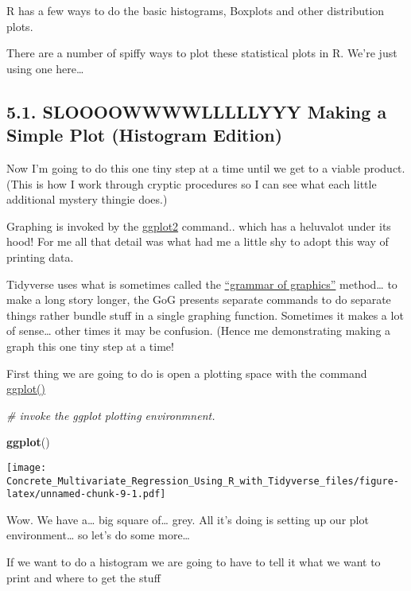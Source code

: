 \documentclass[]{article}
\newenvironment{Shaded}{\begin{snugshade}}{\end{snugshade}}
\newcommand{\CommentTok}[1]{\textcolor[rgb]{0.56,0.35,0.01}{\textit{#1}}}
\newcommand{\KeywordTok}[1]{\textcolor[rgb]{0.13,0.29,0.53}{\textbf{#1}}}
\newcommand{\NormalTok}[1]{#1}
\begin{document}
R has a few ways to do the basic histograms, Boxplots and other
distribution plots.

There are a number of spiffy ways to plot these statistical plots in R.
We're just using one here\ldots{}

\hypertarget{sloooowwwwlllllyyy-making-a-simple-plot-histogram-edition}{%
\subsection{5.1. SLOOOOWWWWLLLLLYYY Making a Simple Plot (Histogram
Edition)}\label{sloooowwwwlllllyyy-making-a-simple-plot-histogram-edition}}

Now I'm going to do this one tiny step at a time until we get to a
viable product. (This is how I work through cryptic procedures so I can
see what each little additional mystery thingie does.)

Graphing is invoked by the \href{https://ggplot2.tidyverse.org}{ggplot2}
command.. which has a heluvalot under its hood! For me all that detail
was what had me a little shy to adopt this way of printing data.

Tidyverse uses what is sometimes called the
\href{https://ramnathv.github.io/pycon2014-r/visualize/ggplot2.html}{``grammar
of graphics''} method\ldots{} to make a long story longer, the GoG
presents separate commands to do separate things rather bundle stuff in
a single graphing function. Sometimes it makes a lot of sense\ldots{}
other times it may be confusion. (Hence me demonstrating making a graph
this one tiny step at a time!

First thing we are going to do is open a plotting space with the command
\href{https://ggplot2.tidyverse.org/reference/ggplot.html}{ggplot()}

\begin{Shaded}
\begin{Highlighting}[]
\CommentTok{# invoke the ggplot plotting environmnent.}

\KeywordTok{ggplot}\NormalTok{() }
\end{Highlighting}
\end{Shaded}

\texttt{[image: Concrete\_Multivariate\_Regression\_Using\_R\_with\_Tidyverse\_files/figure-latex/unnamed-chunk-9-1.pdf]}

Wow. We have a\ldots{} big square of\ldots{} grey. All it's doing is
setting up our plot environment\ldots{} so let's do some more\ldots{}

If we want to do a histogram we are going to have to tell it what we
want to print and where to get the stuff
\end{document}
